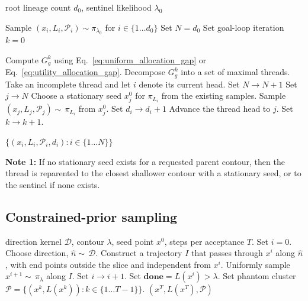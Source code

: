 \documentclass[pdflatex,sn-basic,icol]{sn-jnl}
\theoremstyle{plain}
\theoremstyle{definition}
\begin{document}
\begin{algorithm}
\caption{The JAXNS core algorithm with dynamic lineage allocation, outer goal terminating loop, and inner depth termination loop.}
\begin{algorithmic}[1]
\Require root lineage count $d_0$, sentinel likelihood $\lambda_0$

\State Sample $(x_i, L_i, \mathcal{P}_i) \sim \pi_{\lambda_0}$ for $i\in\{1 \ldots d_0\}$
\State Set $N=d_0$
\State Set goal-loop iteration $k=0$

    \State Compute $G_g^k$ using Eq.~\ref{eq:uniform_allocation_gap} or Eq.~\ref{eq:utility_allocation_gap}.
        \State Decompose $G_g^k$ into a set of maximal threads.
            \State Take an incomplete thread and let $i$ denote its current head.
            \State Set $N \to N + 1$
            \State Set $j \to N$
            \State Choose a stationary seed $x^0_j$ for $\pi_{L_i}$ from the existing samples.
            \State Sample $(x_j, L_j, \mathcal{P}_j) \sim\, \pi_{L_i}$ from $x^0_j$.
            \State Set $d_i \to d_i + 1$
            \State Advance the thread head to $j$.
        \EndWhile
    \EndWhile
    \State Set $k\to k+1$.
\EndWhile

\State \Return $\{(x_i, L_i, \mathcal{P}_i, d_i): i\in\{1 \ldots N\}\}$

\medskip
\Statex \textbf{Note 1:} If no stationary seed exists for a requested parent contour, then the thread is reparented to the closest shallower contour with a stationary seed, or to the sentinel if none exists.
\end{algorithmic}
\label{algo:jaxns}
\end{algorithm}

\subsection{Constrained-prior sampling}

\begin{algorithm}
\caption{The JAXNS constrained sampler using one-dimensional slice sampling with perfect bracketing and uniform trajectory sampling.}
\begin{algorithmic}[1]
\Require direction kernel $\mathcal{D}$, contour $\lambda$, seed point $x^0$, steps per acceptance $T$.
\State Set $i=0$.
    \State Choose direction, $\hat{n}\sim\,\mathcal{D}$.
    \State Construct a trajectory $I$ that passes through $x^i$ along $\hat{n}$, with end points outside the slice and independent from $x^i$.
    \State Uniformly sample $x^{i+1}\sim\,\pi_\lambda$ along $I$.
    \State Set $i \to i + 1$.
    \State Set $\mathbf{done}=L(x^i) > \lambda$.
\EndWhile
\State Set phantom cluster $\mathcal{P} = \{(x^k, L(x^k)) : k \in \{1 \ldots T-1\}\}$.
\State \Return $(x^T, L(x^T), \mathcal{P})$

\medskip
\end{algorithmic}
\label{algo:constrained_sampler}
\end{algorithm}
\end{document}
